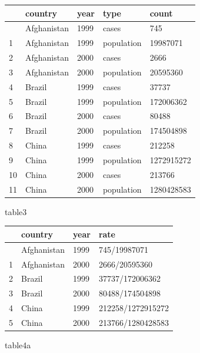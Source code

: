 \documentclass[
  portuguese,
  letterpaper,
  DIV=11,
  numbers=noendperiod]{scrreprt}
\newenvironment{Shaded}{\begin{snugshade}}{\end{snugshade}}
\newcommand{\NormalTok}[1]{\textcolor[rgb]{0.00,0.23,0.31}{#1}}
\theoremstyle{definition}
\theoremstyle{remark}
\begin{document}
\begin{longtable}[]{@{}lllll@{}}
\toprule\noalign{}
& country & year & type & count \\
\midrule\noalign{}
\endhead
\bottomrule\noalign{}
\endlastfoot
0 & Afghanistan & 1999 & cases & 745 \\
1 & Afghanistan & 1999 & population & 19987071 \\
2 & Afghanistan & 2000 & cases & 2666 \\
3 & Afghanistan & 2000 & population & 20595360 \\
4 & Brazil & 1999 & cases & 37737 \\
5 & Brazil & 1999 & population & 172006362 \\
6 & Brazil & 2000 & cases & 80488 \\
7 & Brazil & 2000 & population & 174504898 \\
8 & China & 1999 & cases & 212258 \\
9 & China & 1999 & population & 1272915272 \\
10 & China & 2000 & cases & 213766 \\
11 & China & 2000 & population & 1280428583 \\
\end{longtable}

\begin{Shaded}
\begin{Highlighting}[]
\NormalTok{table3}
\end{Highlighting}
\end{Shaded}

\begin{longtable}[]{@{}llll@{}}
\toprule\noalign{}
& country & year & rate \\
\midrule\noalign{}
\endhead
\bottomrule\noalign{}
\endlastfoot
0 & Afghanistan & 1999 & 745/19987071 \\
1 & Afghanistan & 2000 & 2666/20595360 \\
2 & Brazil & 1999 & 37737/172006362 \\
3 & Brazil & 2000 & 80488/174504898 \\
4 & China & 1999 & 212258/1272915272 \\
5 & China & 2000 & 213766/1280428583 \\
\end{longtable}

\begin{Shaded}
\begin{Highlighting}[]
\NormalTok{table4a}
\end{Highlighting}
\end{Shaded}
\end{document}
